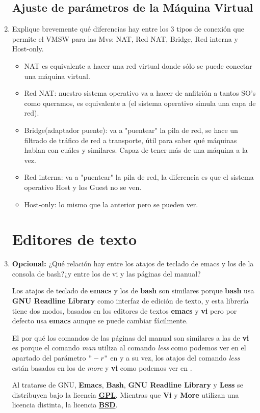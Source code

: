 \documentclass[paper=a4, fontsize=11pt]{scrartcl} %
\numberwithin{equation}{section} %
\numberwithin{figure}{section} %
\numberwithin{table}{section} %
\begin{document}
\begin{enumerate}
	\subsection{Ajuste de parámetros de la Máquina Virtual}
		\item Explique brevemente qué diferencias hay entre los 3 tipos de conexión que permite el
		VMSW para las Mvs: NAT, Red NAT, Bridge, Red interna y Host-only.
		\begin{itemize}
			\item NAT es equivalente a hacer una red virtual donde sólo se puede conectar una máquina
			virtual.
			\item Red NAT: nuestro sistema operativo va a hacer de anfitrión a tantos SO's como
			queramos, es equivalente a (el sistema operativo simula una capa de red).
			\item Bridge(adaptador puente): va a "puentear" la pila de red, se hace un filtrado de
			tráfico de red a transporte, útil para saber qué máquinas hablan con cuáles y similares.
			Capaz de tener más de una máquina a la vez.
			\item Red interna: va a "puentear" la pila de red, la diferencia es que el sistema operativo
			Host y los Guest no se ven.
			\item Host-only: lo mismo que la anterior pero se pueden ver.
		\end{itemize}
		
	\section{Editores de texto}
		\item \textbf{Opcional:} ¿Qué relación hay entre los atajos de teclado de emacs y los de
		la consola de bash?¿y entre los de vi y las páginas del manual?
		
		Los atajos de teclado de \textbf{emacs} y los de \textbf{bash} son similares porque \textbf{bash}
		\cite{man_bash} usa \textbf{GNU Readline Library}\cite{GNURL} como interfaz de edición de texto,
		y esta librería tiene dos modos, basados en los editores de textos \textbf{emacs} y \textbf{vi}
		pero por defecto usa \textbf{emacs} aunque se puede cambiar fácilmente.
		
		El por qué los comandos de las páginas del manual son similares a las de \textbf{vi} es porque
		el comando \textit{man} utiliza al comando \textit{less} como podemos ver en el apartado del
		parámetro $"-r"$ en \cite{man_man} y a su vez, los atajos del comando \textit{less} están
		basados en los de \textit{more} y \textbf{vi} como podemos ver en \cite{man_less}.
		
		Al tratarse de GNU, \textbf{Emacs}, \textbf{Bash}, \textbf{GNU Readline Library} y \textbf{Less}
		se distribuyen bajo la licencia \href{https://www.gnu.org/licenses/gpl.html}{\textbf{GPL}}.
		Mientras que \textbf{Vi} y \textbf{More} utilizan una licencia distinta, la licencia
		\href{http://www.freebsd.org/copyright/license.html}{\textbf{BSD}}.
		
		
\end{enumerate}
\end{document}
